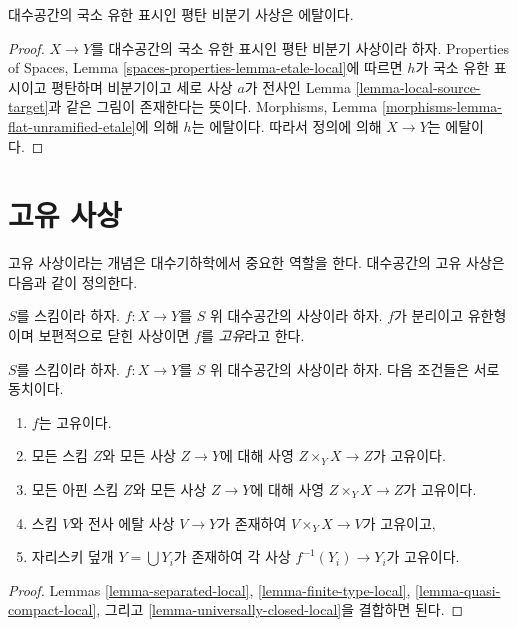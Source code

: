 \begin{lemma}
\label{lemma-unramified-flat-lfp-etale}
대수공간의 국소 유한 표시인 평탄 비분기 사상은 에탈이다.
\end{lemma}

\begin{proof}
$X \to Y$를 대수공간의 국소 유한 표시인 평탄 비분기 사상이라 하자.
Properties of Spaces, Lemma \ref{spaces-properties-lemma-etale-local}에
따르면 $h$가 국소 유한 표시이고 평탄하며 비분기이고 세로 사상 $a$가
전사인 Lemma \ref{lemma-local-source-target}과 같은 그림이 존재한다는
뜻이다. Morphisms, Lemma \ref{morphisms-lemma-flat-unramified-etale}에
의해 $h$는 에탈이다. 따라서 정의에 의해 $X \to Y$는 에탈이다.
\end{proof}






\section{고유 사상}
\label{section-proper}

\noindent
고유 사상이라는 개념은 대수기하학에서 중요한 역할을 한다.
대수공간의 고유 사상은 다음과 같이 정의한다.

\begin{definition}
\label{definition-proper}
$S$를 스킴이라 하자.
$f : X \to Y$를 $S$ 위 대수공간의 사상이라 하자.
$f$가 분리이고 유한형이며 보편적으로 닫힌 사상이면
$f$를 {\it 고유}라고 한다.
\end{definition}

\begin{lemma}
\label{lemma-proper-local}
$S$를 스킴이라 하자. $f : X \to Y$를 $S$ 위 대수공간의 사상이라 하자.
다음 조건들은 서로 동치이다.
\begin{enumerate}
\item $f$는 고유이다.
\item 모든 스킴 $Z$와 모든 사상 $Z \to Y$에 대해 사영
$Z \times_Y X \to Z$가 고유이다.
\item 모든 아핀 스킴 $Z$와 모든 사상 $Z \to Y$에 대해 사영
$Z \times_Y X \to Z$가 고유이다.
\item 스킴 $V$와 전사 에탈 사상 $V \to Y$가 존재하여
$V \times_Y X \to V$가 고유이고,
\item 자리스키 덮개 $Y = \bigcup Y_i$가 존재하여 각 사상
$f^{-1}(Y_i) \to Y_i$가 고유이다.
\end{enumerate}
\end{lemma}

\begin{proof}
Lemmas \ref{lemma-separated-local}, \ref{lemma-finite-type-local},
\ref{lemma-quasi-compact-local}, 그리고
\ref{lemma-universally-closed-local}을 결합하면 된다.
\end{proof}

